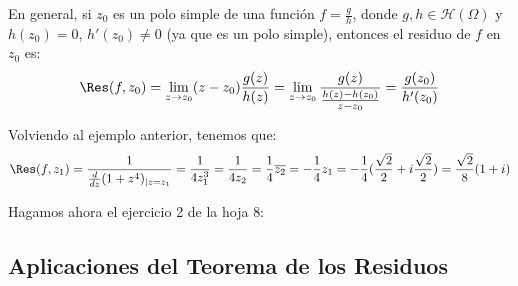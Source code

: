 En general, si $z_0$ es un polo simple de una función $f = \frac{g}{h}$, donde $g,h \in \mathcal{H}(\Omega)$ y $h(z_0) = 0$, $h'(z_0) \neq 0$ (ya que es un polo simple), entonces el residuo de $f$ en $z_0$ es:
\[
    \Res(f,z_0) =
    \lim_{z \to z_0} (z-z_0) \frac{g(z)}{h(z)} =
    \lim_{z \to z_0} \frac{g(z)}{\frac{h(z)-h(z_0)}{z-z_0}} =
    \frac{g(z_0)}{h'(z_0)}
\]

Volviendo al ejemplo anterior, tenemos que:
\[
    \Res(f,z_1) =
    \frac{1}{\frac{d}{dz} (1+z^4)_{|z=z_1}} =
    \frac{1}{4 z_1^3} =
    \frac{1}{4 z_2} =
    \frac{1}{4} \overline{z_2} =
    -\frac{1}{4} z_1 =
    -\frac{1}{4} (\frac{\sqrt{2}}{2} + i \frac{\sqrt{2}}{2}) =
    \frac{\sqrt{2}}{8} (1 + i)
\]

Hagamos ahora el ejercicio 2 de la hoja 8:


\subsection{Aplicaciones del Teorema de los Residuos}

